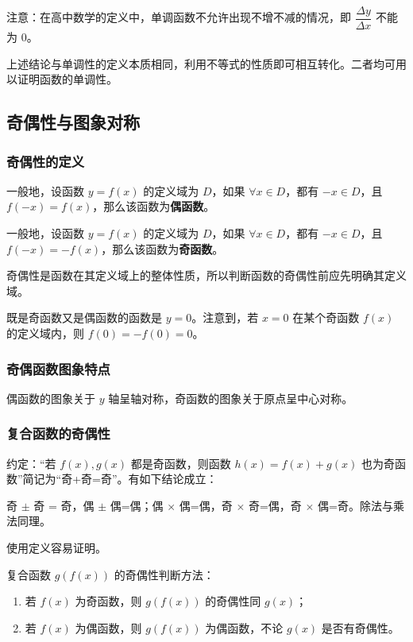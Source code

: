 \documentclass[a4paper,openany]{ctexbook}
\begin{document}
注意：在高中数学的定义中，单调函数不允许出现不增不减的情况，即 \(\dfrac{\Delta y}{\Delta x}\) 不能为 \(0\)。

上述结论与单调性的定义本质相同，利用不等式的性质即可相互转化。二者均可用以证明函数的单调性。

\subsection{奇偶性与图象对称}

\subsubsection{奇偶性的定义}

一般地，设函数 \(y=f(x)\) 的定义域为 \(D\)，如果 \(\forall x \in D\)，都有 \(-x \in D\)，且 \(f(-x)=f(x)\)，那么该函数为\textbf{偶函数}。

一般地，设函数 \(y=f(x)\) 的定义域为 \(D\)，如果 \(\forall x \in D\)，都有 \(-x \in D\)，且 \(f(-x)=-f(x)\)，那么该函数为\textbf{奇函数}。

奇偶性是函数在其定义域上的整体性质，所以判断函数的奇偶性前应先明确其定义域。

既是奇函数又是偶函数的函数是 \(y=0\)。注意到，若 \(x=0\) 在某个奇函数 \(f(x)\) 的定义域内，则 \(f(0)=-f(0)=0\)。

\subsubsection{奇偶函数图象特点}

偶函数的图象关于 \(y\) 轴呈轴对称，奇函数的图象关于原点呈中心对称。

\subsubsection{复合函数的奇偶性}

约定：“若 \(f(x),g(x)\) 都是奇函数，则函数 \(h(x)=f(x)+g(x)\) 也为奇函数”简记为“奇+奇=奇”。有如下结论成立：

奇 \(\pm\) 奇 = 奇，偶 \(\pm\) 偶=偶；偶 \(\times\) 偶=偶，奇 \(\times\) 奇=偶，奇 \(\times\) 偶=奇。除法与乘法同理。

使用定义容易证明。

复合函数 \(g(f(x))\) 的奇偶性判断方法：
\begin{enumerate}
    \item 若 \(f(x)\) 为奇函数，则 \(g(f(x))\) 的奇偶性同 \(g(x)\)；
    \item 若 \(f(x)\) 为偶函数，则 \(g(f(x))\) 为偶函数，不论 \(g(x)\) 是否有奇偶性。
\end{enumerate}
\end{document}
